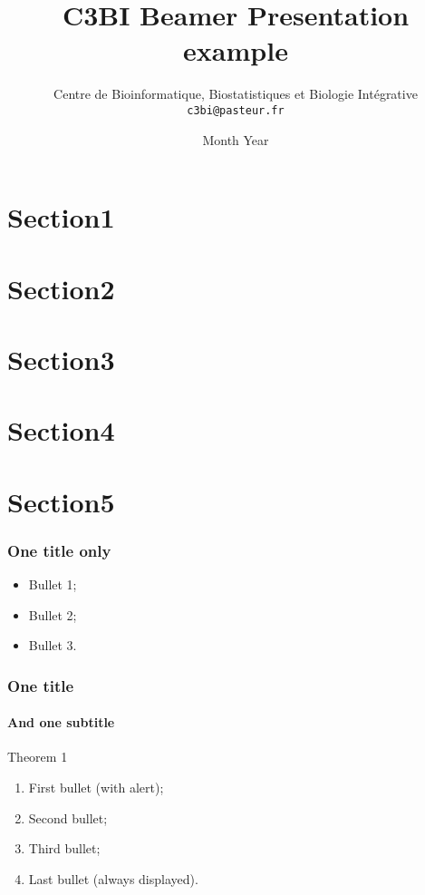 \documentclass{beamer}
\title{C3BI  Beamer  Presentation example}
\date[YYYY/mm]{Month Year}
\author[C3BI]{Centre de Bioinformatique, Biostatistiques et Biologie Intégrative \texttt{c3bi@pasteur.fr}}
\begin{document}
\begin{frame}
\titlepage
\end{frame}

\section{Section1}
\section{Section2}
\section{Section3}
\section{Section4}
\section{Section5}

\begin{frame} 
\frametitle{One title only} 
\begin{itemize}
\item Bullet 1;
\item Bullet 2;
\item Bullet 3.
\end{itemize}
\end{frame}


\begin{frame} 
\frametitle{One title} 
\framesubtitle{And one subtitle} 
\begin{theorem}
  Theorem 1
\end{theorem} 
\begin{enumerate} 
\item<1-| alert@1> First bullet (with alert);
\item<2-> Second bullet;
\item<3-> Third bullet; 
\item<1-> Last bullet (always displayed).
\end{enumerate}
\end{frame}
\end{document}
